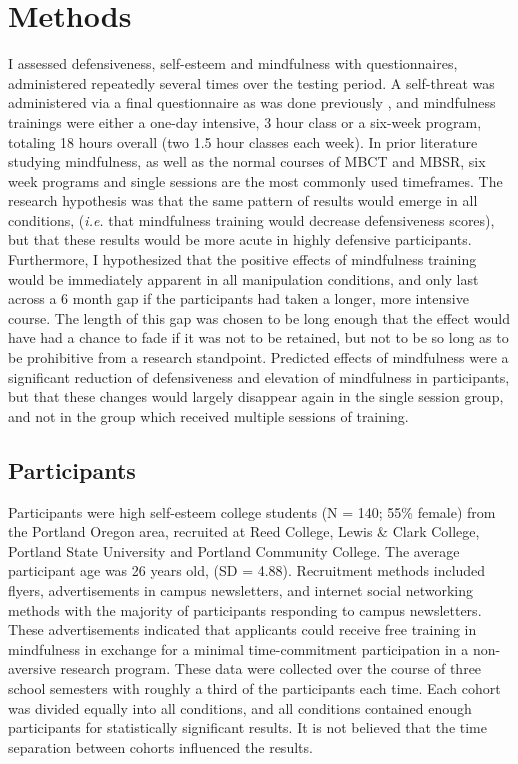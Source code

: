 \documentclass[jou]{apa}
\begin{document}
\section{Methods}
I assessed defensiveness, self-esteem and mindfulness with questionnaires, administered repeatedly several times over the testing period.  A self-threat was administered via a final questionnaire as was done previously \cite{lakey2008}, and mindfulness trainings were either a one-day intensive, 3 hour class or a six-week program, totaling 18 hours overall (two 1.5 hour classes each week).  In prior literature studying mindfulness, as well as the normal courses of MBCT and MBSR, six week programs and single sessions are the most commonly used timeframes.  The research hypothesis was that the same pattern of results would emerge in all conditions, (\textit{i.e.} that mindfulness training would decrease defensiveness scores), but that these results would be more acute in highly defensive participants.  Furthermore, I hypothesized that the positive effects of mindfulness training would be immediately apparent in all manipulation conditions, and only last across a 6 month gap if the participants had taken a longer, more intensive course.  The length of this gap was chosen to be long enough that the effect would have had a chance to fade if it was not to be retained, but not to be so long as to be prohibitive from a research standpoint.  Predicted effects of mindfulness were a significant reduction of defensiveness and elevation of mindfulness in participants, but that these changes would largely disappear again in the single session group, and not in the group which received multiple sessions of training.  


\subsection{Participants}
Participants were high self-esteem college students (N = 140; 55\% female) from the Portland Oregon area, recruited at Reed College, Lewis \& Clark College, Portland State University and Portland Community College.  The average participant age was 26 years old, (SD = 4.88).  Recruitment methods included flyers, advertisements in campus newsletters, and internet social networking methods with the majority of participants responding to campus newsletters.  These advertisements indicated that applicants could receive free training in mindfulness in exchange for a minimal time-commitment participation in a non-aversive research program.  These data were collected over the course of three school semesters with roughly a third of the participants each time.  Each cohort was divided equally into all conditions, and all conditions contained enough participants for statistically significant results.  It is not believed that the time separation between cohorts influenced the results.  
 
\end{document}
